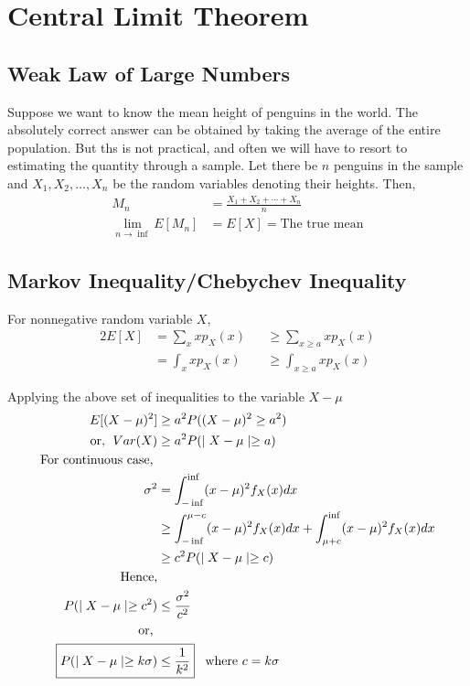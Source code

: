 \documentclass[../probability-notes.tex]{subfiles}
\begin{document}
    \section{Central Limit Theorem}
    \subsection{Weak Law of Large Numbers}
    Suppose we want to know the mean height of penguins in the world. The absolutely correct answer can be obtained by taking the average of the entire population. But ths is not practical, and often we will have to resort to estimating the quantity through a sample. Let there be $n$ penguins in the sample and $X_{1}, X_{2}, \ldots, X_{n}$ be the random variables denoting their heights. Then,
    \begin{align*}
        M_{n} &= \frac{X_{1} + X_{2} + \cdots + X_{n}}{n}\\
        \lim_{n \to \inf} E[M_{n}] &= E[X] = \text{The true mean}
    \end{align*}

    \subsection{Markov Inequality/Chebychev Inequality}
    For nonnegative random variable $X$,
    \begin{alignat*}{2}
        E[X] &= \sum_{x}xp_{X}(x) &&\geq \sum_{x \geq a}xp_{X}(x) \tag*{discrete case}\\
            &= \int_{x}xp_{X}(x) &&\geq \int_{x \geq a}xp_{X}(x) \tag*{continuous case}
    \end{alignat*}
    
    Applying the above set of inequalities to the variable $X - \mu$
    \begin{align*}
        E[(X - \mu)^{2}] &\geq a^{2} P((X - \mu)^{2} \geq a^{2}) \\
        \text{or, \;} Var(X) &\geq a^{2} P(\mid X - \mu \mid \geq a)\\
        \text{For continuous case, }\\
        \sigma^{2} &= \int_{-\inf}^{\inf} (x-\mu)^{2}f_{X}(x) dx\\
                  &\geq \int_{-\inf}^{\mu-c} (x-\mu)^{2}f_{X}(x)dx + \int_{\mu+c}^{\inf} (x-\mu)^{2}f_{X}(x)dx\\
                  &\geq c^{2} P(\mid X - \mu \mid \geq c)\\
        \text{Hence,}\\
        P(\mid X - \mu \mid \geq c^{2}) &\leq \frac{\sigma^{2}}{c^{2}}\\
        \text{or, } \\
        \Aboxed{P(\mid X - \mu \mid \geq k\sigma) &\leq \frac{1}{k^{2}}}\text{\;\;\;where $c = k\sigma$}
    \end{align*}
\end{document}
